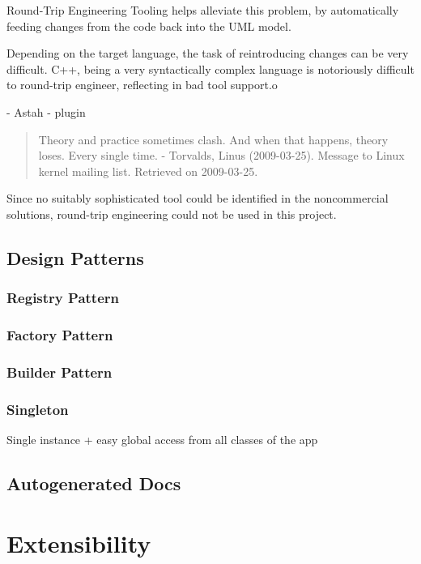 Round-Trip Engineering Tooling helps alleviate this problem, by automatically feeding changes from the code back into the UML model.

Depending on the target language, the task of reintroducing changes can be very difficult. C++, being a very syntactically complex language is notoriously difficult to round-trip engineer, reflecting in bad tool support.o


- Astah - plugin

\begin{quote}
Theory and practice sometimes clash. And when that happens, theory loses. Every single time.
- Torvalds, Linus (2009-03-25). Message to Linux kernel mailing list. Retrieved on 2009-03-25.
\end{quote}

Since no suitably sophisticated tool could be identified in the noncommercial solutions, round-trip engineering could not be used in this project.

\subsection{Design Patterns}
\subsubsection{Registry Pattern}

\subsubsection{Factory Pattern}

\subsubsection{Builder Pattern}

\subsubsection{Singleton}
Single instance + easy global access from all classes of the app


\subsection{Autogenerated Docs}

\section{Extensibility}

